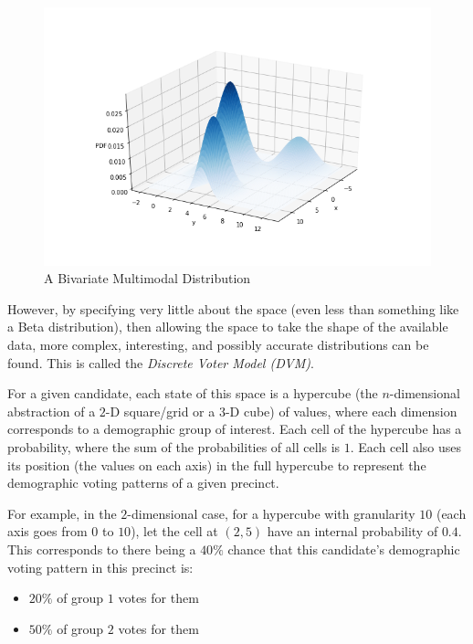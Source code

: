 \begin{figure}[ht]\centering
 \includegraphics[width=\linewidth]{figures/multimodal_example.png}
 \caption{A Bivariate Multimodal Distribution}
 \label{fig:multimodal_example}
\end{figure}

However, by specifying very little about the space (even less than something like a Beta distribution), then allowing the space to take the shape of the available data, more complex, interesting, and possibly accurate distributions can be found. This is called the \textit{Discrete Voter Model (DVM)}.

For a given candidate, each state of this space is a hypercube (the $n$-dimensional abstraction of a $2$-D square/grid or a $3$-D cube) of values, where each dimension corresponds to a demographic group of interest. Each cell of the hypercube has a probability, where the sum of the probabilities of all cells is $1$. Each cell also uses its position (the values on each axis) in the full hypercube to represent the demographic voting patterns of a given precinct.

For example, in the $2$-dimensional case, for a hypercube with granularity $10$ (each axis goes from $0$ to $10$), let the cell at $(2, 5)$ have an internal probability of $0.4$. This corresponds to there being a $40\%$ chance that this candidate's demographic voting pattern in this precinct is:
\begin{itemize}
  \item $20\%$ of group $1$ votes for them
  \item $50\%$ of group $2$ votes for them
\end{itemize}

